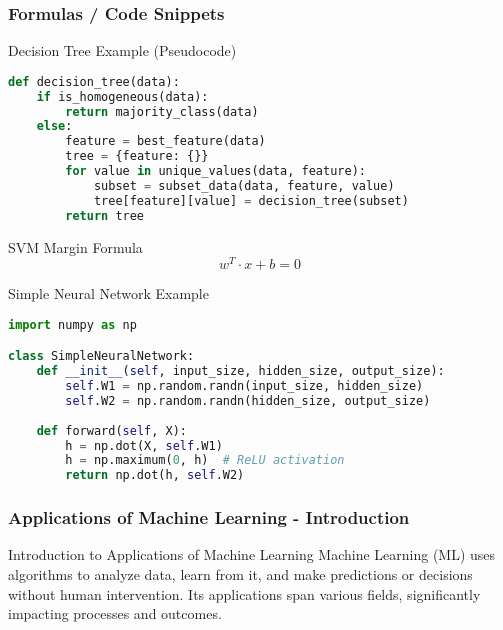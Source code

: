\documentclass[aspectratio=169]{beamer}
\begin{document}
\begin{frame}[fragile]
    \frametitle{Formulas / Code Snippets}
    \begin{block}{Decision Tree Example (Pseudocode)}
    \begin{lstlisting}[language=Python]
def decision_tree(data):
    if is_homogeneous(data):
        return majority_class(data)
    else:
        feature = best_feature(data)
        tree = {feature: {}}
        for value in unique_values(data, feature):
            subset = subset_data(data, feature, value)
            tree[feature][value] = decision_tree(subset)
        return tree
    \end{lstlisting}
    \end{block}

    \begin{block}{SVM Margin Formula}
    \begin{equation}
        w^T \cdot x + b = 0
    \end{equation}
    \end{block}

    \begin{block}{Simple Neural Network Example}
    \begin{lstlisting}[language=Python]
import numpy as np

class SimpleNeuralNetwork:
    def __init__(self, input_size, hidden_size, output_size):
        self.W1 = np.random.randn(input_size, hidden_size)
        self.W2 = np.random.randn(hidden_size, output_size)
    
    def forward(self, X):
        h = np.dot(X, self.W1)
        h = np.maximum(0, h)  # ReLU activation
        return np.dot(h, self.W2)
    \end{lstlisting}
    \end{block}
\end{frame}

\begin{frame}[fragile]
    \frametitle{Applications of Machine Learning - Introduction}
    \begin{block}{Introduction to Applications of Machine Learning}
    Machine Learning (ML) uses algorithms to analyze data, learn from it, and make predictions or decisions without human intervention. Its applications span various fields, significantly impacting processes and outcomes.
    \end{block}
\end{frame}
\end{document}
